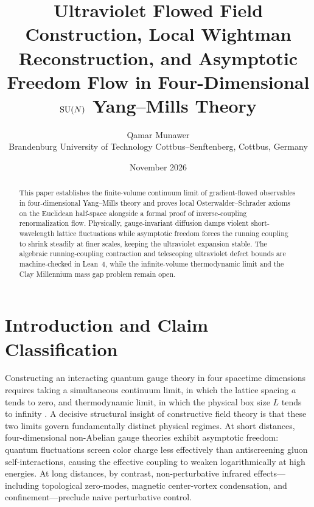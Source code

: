 \documentclass[11pt,a4paper]{article}
\title{Ultraviolet Flowed Field Construction, Local Wightman Reconstruction, and Asymptotic Freedom Flow in Four-Dimensional $\mathrm{SU}(N)$ Yang--Mills Theory}
\author{Qamar Munawer \\ \small Brandenburg University of Technology Cottbus--Senftenberg, Cottbus, Germany}
\date{November 2026}
\begin{document}
\maketitle

\begin{abstract}
This paper establishes the finite-volume continuum limit of gradient-flowed observables in four-dimensional Yang--Mills theory and proves local Osterwalder--Schrader axioms on the Euclidean half-space alongside a formal proof of inverse-coupling renormalization flow. Physically, gauge-invariant diffusion damps violent short-wavelength lattice fluctuations while asymptotic freedom forces the running coupling to shrink steadily at finer scales, keeping the ultraviolet expansion stable. The algebraic running-coupling contraction and telescoping ultraviolet defect bounds are machine-checked in Lean~4, while the infinite-volume thermodynamic limit and the Clay Millennium mass gap problem remain open.
\end{abstract}

\section{Introduction and Claim Classification}
Constructing an interacting quantum gauge theory in four spacetime dimensions requires taking a simultaneous continuum limit, in which the lattice spacing $a$ tends to zero, and thermodynamic limit, in which the physical box size $L$ tends to infinity \cite{JaffeWitten2000,Wilson1974}. A decisive structural insight of constructive field theory is that these two limits govern fundamentally distinct physical regimes. At short distances, four-dimensional non-Abelian gauge theories exhibit asymptotic freedom: quantum fluctuations screen color charge less effectively than antiscreening gluon self-interactions, causing the effective coupling to weaken logarithmically at high energies. At long distances, by contrast, non-perturbative infrared effects---including topological zero-modes, magnetic center-vortex condensation, and confinement---preclude naive perturbative control.
\end{document}

